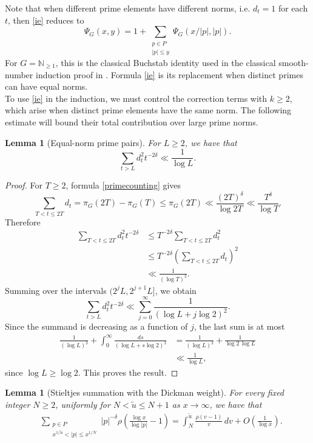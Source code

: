 \documentclass[10pt,a4paper]{amsart}
\newtheorem{lemma}[theorem]{Lemma}
\begin{document}
Note that when different prime elements have different norms, i.e.
$d_t=1$ for each $t$, then \eqref{ie} reduces to
\[
\Psi_G(x,y)
=
1+\sum_{\substack{p\in P\\|p|\le y}}
\Psi_G(x/|p|,|p|).
\]
For $G=\mathbb N_{\geq 1}$, this is the classical Buchstab identity
used in the classical smooth-number induction proof in \cite[Chapter 9, Theorem 9.3]{de2023analytic}. Formula \eqref{ie}
is its replacement when distinct primes can have equal norms.\\
To use \eqref{ie} in the induction, we must control
the correction terms with $k\ge2$, which arise when
distinct prime elements have the same norm.
The following estimate will bound their total
contribution over large prime norms.
\begin{lemma}[Equal-norm prime pairs]\label{lem:collision}
For $L\ge2$, we have that
\[
\sum_{t>L}d_t^2t^{-2\delta}
\ll\frac1{\log L}.\]
\end{lemma}

\begin{proof}
For $T\ge2$, formula \eqref{primecounting} gives
\[
\sum_{T<t\le2T}d_t
=
\pi_G(2T)-\pi_G(T) \leq \pi_G(2T) \ll \frac{{(2T)}^\delta}{\log 2T}
\ll\frac{T^\delta}{\log T}.
\]
Therefore
\begin{align*}
\sum_{T<t\le2T}d_t^2t^{-2\delta}
&\le
T^{-2\delta}\sum_{T<t\le2T}d_t^2\\
&\le
T^{-2\delta}
\left(\sum_{T<t\le2T}d_t\right)^2\\
&\ll\frac1{(\log T)^2}.
\end{align*}
Summing over the intervals $(2^jL,2^{j+1}L]$, we obtain
\[
\sum_{t>L}d_t^2t^{-2\delta}
\ll
\sum_{j=0}^{\infty}
\frac1{(\log L+j\log2)^2}.
\]
Since the summand is decreasing as a function of $j$,
the last sum is at most
\begin{align*}
\frac1{(\log L)^2}
+\int_0^\infty
\frac{ds}{(\log L+s\log2)^2}
&=
\frac1{(\log L)^2}
+\frac1{\log2\,\log L}\\
&\ll\frac1{\log L},
\end{align*}
since $\log L \geq \log 2$. This proves the result.
\end{proof}

\begin{lemma}[Stieltjes summation with the Dickman weight]
\label{lem:stieltjes}
For every fixed integer $N\ge2$, uniformly for
$N<\tilde u\le N+1$ as $x\to\infty$, we have that
\begin{align*}
&\sum_{\substack{p\in P\\
x^{1/\tilde u}<|p|\le x^{1/N}}}
|p|^{-\delta}
\rho\!\left(\frac{\log x}{\log|p|}-1\right)=
\int_N^{\tilde u}\frac{\rho(v-1)}v\,dv
+O\!\left(\frac1{\log x}\right).
\end{align*}
\end{lemma}
\end{document}

